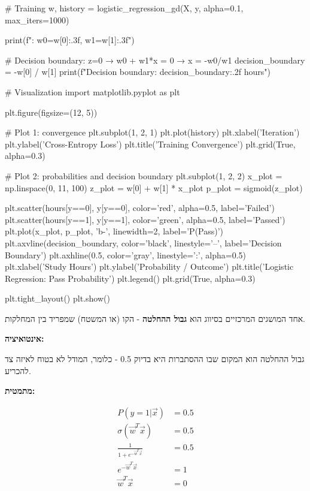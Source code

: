 \begin{pythonbox}
# Training
w, history = logistic_regression_gd(X, y, alpha=0.1, max_iters=1000)

print(f"\nWeights: w0={w[0]:.3f}, w1={w[1]:.3f}")

# Decision boundary: z=0 → w0 + w1*x = 0 → x = -w0/w1
decision_boundary = -w[0] / w[1]
print(f"Decision boundary: {decision_boundary:.2f} hours")

# Visualization
import matplotlib.pyplot as plt

plt.figure(figsize=(12, 5))

# Plot 1: convergence
plt.subplot(1, 2, 1)
plt.plot(history)
plt.xlabel('Iteration')
plt.ylabel('Cross-Entropy Loss')
plt.title('Training Convergence')
plt.grid(True, alpha=0.3)

# Plot 2: probabilities and decision boundary
plt.subplot(1, 2, 2)
x_plot = np.linspace(0, 11, 100)
z_plot = w[0] + w[1] * x_plot
p_plot = sigmoid(z_plot)

plt.scatter(hours[y==0], y[y==0], color='red', alpha=0.5, label='Failed')
plt.scatter(hours[y==1], y[y==1], color='green', alpha=0.5, label='Passed')
plt.plot(x_plot, p_plot, 'b-', linewidth=2, label='P(Pass)')
plt.axvline(decision_boundary, color='black', linestyle='--', label='Decision Boundary')
plt.axhline(0.5, color='gray', linestyle=':', alpha=0.5)
plt.xlabel('Study Hours')
plt.ylabel('Probability / Outcome')
plt.title('Logistic Regression: Pass Probability')
plt.legend()
plt.grid(True, alpha=0.3)

plt.tight_layout()
plt.show()
\end{pythonbox}


אחד המושגים המרכזיים בסיווג הוא \textbf{גבול ההחלטה}  - הקו (או המשטח) שמפריד בין המחלקות.

\textbf{אינטואיציה:}

גבול ההחלטה הוא המקום שבו ההסתברות היא בדיוק \num{0.5} - כלומר, המודל לא בטוח לאיזה צד להכריע.

\textbf{מתמטית:}

\begin{align}
P(y=1|\vec{x}) &= 0.5 \nonumber \\
\sigma(\vec{w}^T\vec{x}) &= 0.5 \nonumber \\
\frac{1}{1 + e^{-\vec{w}^T\vec{x}}} &= 0.5 \nonumber \\
e^{-\vec{w}^T\vec{x}} &= 1 \nonumber \\
\vec{w}^T\vec{x} &= 0
\end{align}

